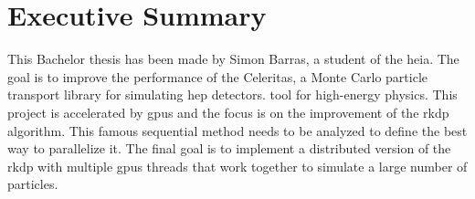 \chapter{Executive Summary}
\label{ch:report-executive-summary}

This Bachelor thesis has been made by Simon Barras, a student of the \acrlong{heia}.
The goal is to improve the performance of the Celeritas, a Monte Carlo particle
transport library for simulating \acrfull{hep} detectors.
tool for high-energy physics.
This project is accelerated by \acrshort{gpu}s and the focus is on
the improvement of the \acrshort{rkdp} algorithm.
This famous sequential method needs to be analyzed to define the best way to
parallelize it.
The final goal is to implement a distributed version of the \acrshort{rkdp}
with multiple \acrshort{gpu}s threads that work together to simulate a large
number of particles.
